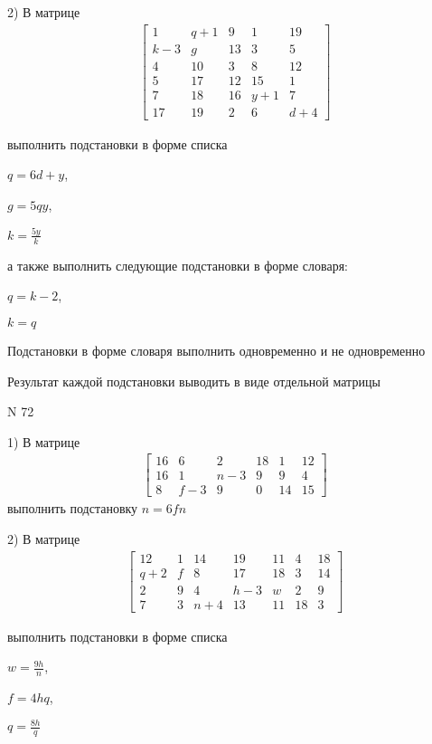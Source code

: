 \documentclass[11pt]{report}
\begin{document}
    2) В матрице
\begin{align*}
\left[\begin{matrix}1 & q + 1 & 9 & 1 & 19\\k - 3 & g & 13 & 3 & 5\\4 & 10 & 3 & 8 & 12\\5 & 17 & 12 & 15 & 1\\7 & 18 & 16 & y + 1 & 7\\17 & 19 & 2 & 6 & d + 4\end{matrix}\right]
\end{align*}

выполнить подстановки в форме списка

$q=6 d + y$,

$g=5 q y$,

$k=\frac{5 y}{k}$

а также выполнить следующие подстановки в форме словаря:

$q=k - 2$,

$k=q$


    Подстановки в форме словаря выполнить одновременно и не одновременно


    Результат каждой подстановки выводить в виде отдельной матрицы

\newpage
N 72


    1) В матрице
\begin{align*}
\left[\begin{matrix}16 & 6 & 2 & 18 & 1 & 12\\16 & 1 & n - 3 & 9 & 9 & 4\\8 & f - 3 & 9 & 0 & 14 & 15\end{matrix}\right]
\end{align*}
выполнить подстановку $n=6 f n$


    2) В матрице
\begin{align*}
\left[\begin{matrix}12 & 1 & 14 & 19 & 11 & 4 & 18\\q + 2 & f & 8 & 17 & 18 & 3 & 14\\2 & 9 & 4 & h - 3 & w & 2 & 9\\7 & 3 & n + 4 & 13 & 11 & 18 & 3\end{matrix}\right]
\end{align*}

выполнить подстановки в форме списка

$w=\frac{9 h}{n}$,

$f=4 h q$,

$q=\frac{8 h}{q}$
\end{document}
